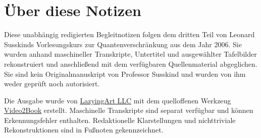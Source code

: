 \documentclass[11pt,oneside]{book}
\begin{document}
\frontmatter
\hypersetup{pageanchor=false}

\hypersetup{pageanchor=true}

\clearpage
\chapter{Über diese Notizen}
Diese unabhängig redigierten Begleitnotizen folgen dem dritten Teil von Leonard Susskinds Vorlesungskurs zur Quantenverschränkung aus dem Jahr 2006. Sie wurden anhand maschineller Transkripte, Untertitel und ausgewählter Tafelbilder rekonstruiert und anschließend mit dem verfügbaren Quellenmaterial abgeglichen. Sie sind kein Originalmanuskript von Professor Susskind und wurden von ihm weder geprüft noch autorisiert.

Die Ausgabe wurde von \href{https://lazying.art}{LazyingArt LLC} mit dem quelloffenen Werkzeug \href{https://github.com/lachlanchen/Video2Book}{Video2Book} erstellt. Maschinelle Transkripte sind separat verfügbar und können Erkennungsfehler enthalten. Redaktionelle Klarstellungen und nichttriviale Rekonstruktionen sind in Fußnoten gekennzeichnet.
\clearpage
\tableofcontents
\mainmatter








\end{document}

